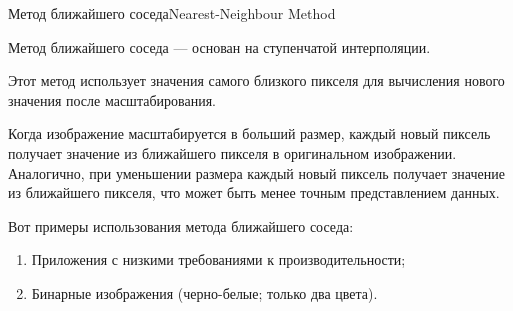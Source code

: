 \documentclass{beamer}
\begin{document}
	\begin{frame}{Метод ближайшего соседа}{Nearest-Neighbour Method}

	 	Метод ближайшего соседа --- основан на ступенчатой интерполяции.

		Этот метод использует значения самого близкого пикселя для вычисления нового значения после масштабирования.

		Когда изображение масштабируется в больший размер, каждый новый пиксель получает значение из ближайшего пикселя в оригинальном изображении. Аналогично, при уменьшении размера каждый новый пиксель получает значение из ближайшего пикселя, что может быть менее точным представлением данных.
				
		Вот примеры использования метода ближайшего соседа:
		
		\begin{enumerate}
			\item 
			Приложения с низкими требованиями к производительности;
			\item 
			Бинарные изображения (черно-белые; только два цвета).
		\end{enumerate}





		
	\end{frame}
	
\end{document}
